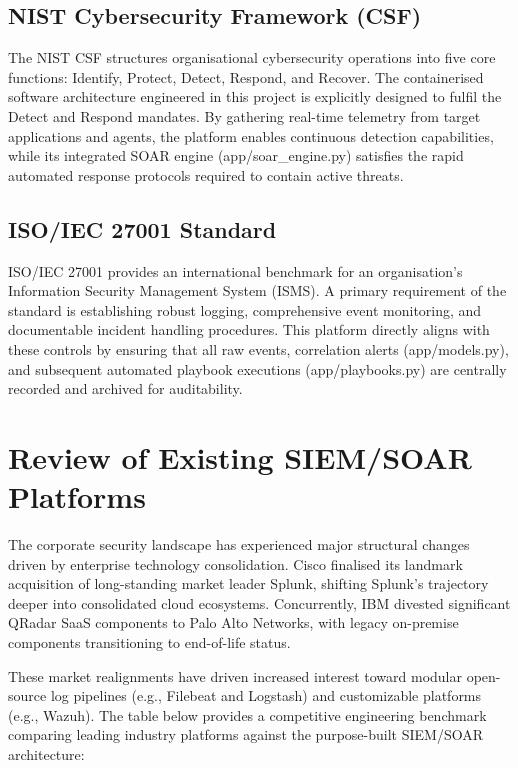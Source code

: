 \subsection{NIST Cybersecurity Framework (CSF)}

The NIST CSF structures organisational cybersecurity operations into five core functions: Identify, Protect, Detect, Respond, and Recover. The containerised software architecture engineered in this project is explicitly designed to fulfil the Detect and Respond mandates. By gathering real-time telemetry from target applications and agents, the platform enables continuous detection capabilities, while its integrated SOAR engine (app/soar\_engine.py) satisfies the rapid automated response protocols required to contain active threats.

\subsection{ISO/IEC 27001 Standard}

ISO/IEC 27001 provides an international benchmark for an organisation's Information Security Management System (ISMS). A primary requirement of the standard is establishing robust logging, comprehensive event monitoring, and documentable incident handling procedures. This platform directly aligns with these controls by ensuring that all raw events, correlation alerts (app/models.py), and subsequent automated playbook executions (app/playbooks.py) are centrally recorded and archived for auditability.

\section{Review of Existing SIEM/SOAR Platforms}

The corporate security landscape has experienced major structural changes driven by enterprise technology consolidation. Cisco finalised its landmark acquisition of long-standing market leader Splunk, shifting Splunk's trajectory deeper into consolidated cloud ecosystems. Concurrently, IBM divested significant QRadar SaaS components to Palo Alto Networks, with legacy on-premise components transitioning to end-of-life status.

These market realignments have driven increased interest toward modular open-source log pipelines (e.g., Filebeat and Logstash) and customizable platforms (e.g., Wazuh). The table below provides a competitive engineering benchmark comparing leading industry platforms against the purpose-built SIEM/SOAR architecture:

